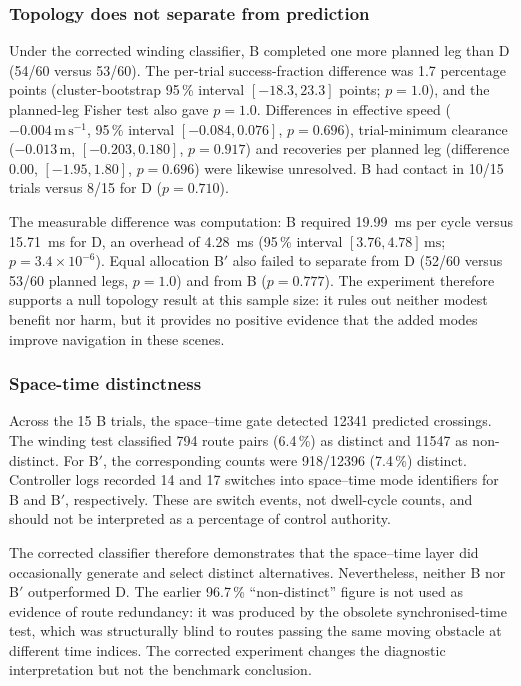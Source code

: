 \documentclass[journal]{IEEEtran}
\begin{document}
\subsubsection{Topology does not separate from prediction}
Under the corrected winding classifier, B completed one more planned leg than
D (54/60 versus 53/60). The per-trial success-fraction difference was
1.7 percentage points (cluster-bootstrap 95\,\% interval
$[-18.3,23.3]$ points; $p=1.0$), and the planned-leg Fisher test also gave
$p=1.0$. Differences in effective speed
($-0.004\,\mathrm{m\,s^{-1}}$, 95\,\% interval $[-0.084,0.076]$,
$p=0.696$), trial-minimum clearance ($-0.013\,\mathrm{m}$,
$[-0.203,0.180]$, $p=0.917$) and recoveries per planned leg (difference
$0.00$, $[-1.95,1.80]$, $p=0.696$) were likewise unresolved. B had contact in
10/15 trials versus 8/15 for D ($p=0.710$).

The measurable difference was computation: B required
\SI{19.99}{\milli\second} per cycle versus \SI{15.71}{\milli\second} for D,
an overhead of \SI{4.28}{\milli\second} (95\,\% interval
$[3.76,4.78]\,\mathrm{ms}$; $p=3.4\times10^{-6}$). Equal allocation B$'$ also
failed to separate from D (52/60 versus 53/60 planned legs, $p=1.0$) and from B
($p=0.777$). The experiment therefore supports a null topology result at this
sample size: it rules out neither modest benefit nor harm, but it provides no
positive evidence that the added modes improve navigation in these scenes.

\subsubsection{Space-time distinctness}
\label{sec:distinctness}
Across the 15 B trials, the space--time gate detected \num{12341} predicted
crossings. The winding test classified \num{794} route pairs (6.4\,\%) as
distinct and \num{11547} as non-distinct. For B$'$, the corresponding counts
were \num{918}/\num{12396} (7.4\,\%) distinct. Controller logs recorded 14 and
17 switches into space--time mode identifiers for B and B$'$, respectively.
These are switch events, not dwell-cycle counts, and should not be interpreted
as a percentage of control authority.

The corrected classifier therefore demonstrates that the space--time layer did
occasionally generate and select distinct alternatives. Nevertheless, neither
B nor B$'$ outperformed D. The earlier 96.7\,\% ``non-distinct'' figure is not
used as evidence of route redundancy: it was produced by the obsolete
synchronised-time test, which was structurally blind to routes passing the same
moving obstacle at different time indices. The corrected experiment changes
the diagnostic interpretation but not the benchmark conclusion.
\end{document}
